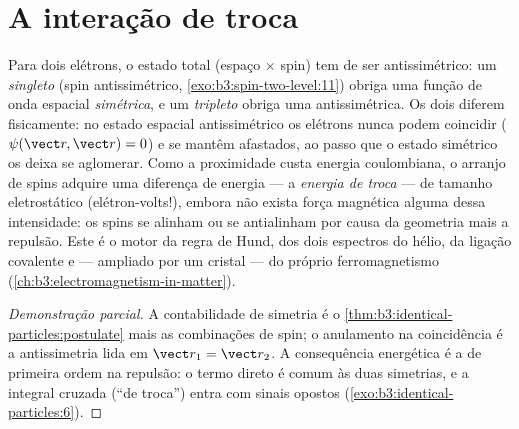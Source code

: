 \section{A interação de troca}

\begin{proposition}\label{prop:b3:identical-particles:exchange-force}
Para dois elétrons, o estado total (espaço $\times$ spin) tem de ser
antissimétrico: um \emph{singleto} (spin antissimétrico,
\cref{exo:b3:spin-two-level:11}) obriga uma função de onda espacial
\emph{simétrica}, e um \emph{tripleto} obriga uma antissimétrica. Os
dois diferem fisicamente: no estado espacial antissimétrico os elétrons
nunca podem coincidir ($\psi(\vect r, \vect r) = 0$) e se mantêm
afastados, ao passo que o estado simétrico os deixa se aglomerar. Como
a proximidade custa energia coulombiana, o arranjo de spins adquire uma
diferença de energia --- a \emph{energia de troca} --- de tamanho
eletrostático (elétron-volts!), embora não exista força magnética
alguma dessa intensidade: os spins se alinham ou se antialinham por
causa da geometria mais a repulsão. Este é o motor da regra de Hund,
dos dois espectros do hélio, da ligação covalente e --- ampliado por um
cristal --- do próprio ferromagnetismo
(\cref{ch:b3:electromagnetism-in-matter}).
\end{proposition}

\begin{proof}[Demonstração parcial]
A contabilidade de simetria é o
\cref{thm:b3:identical-particles:postulate} mais as combinações de
spin; o anulamento na coincidência é a antissimetria lida em
$\vect r_1 = \vect r_2$. A consequência energética é a  de primeira ordem na repulsão: o termo direto é comum às
duas simetrias, e a integral cruzada (``de troca'') entra com sinais
opostos (\cref{exo:b3:identical-particles:6}).
\end{proof}

